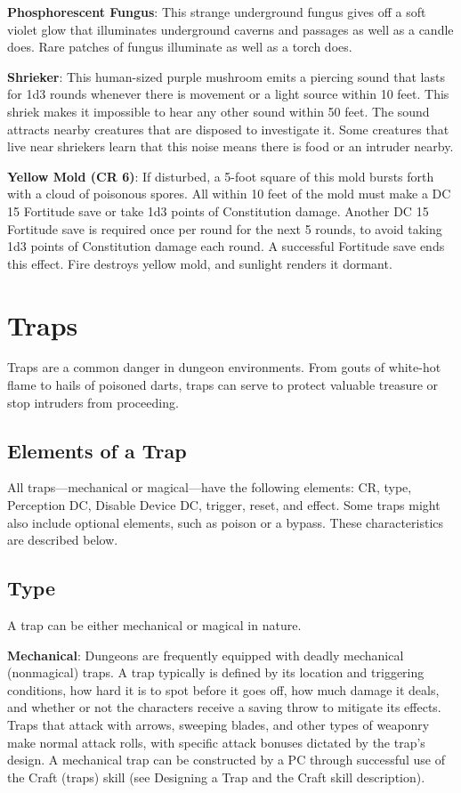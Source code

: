 \textbf{Phosphorescent Fungus}: This strange underground fungus gives off a soft violet glow that illuminates underground caverns and passages as well as a candle does. Rare patches of fungus illuminate as well as a torch does.
				
\textbf{Shrieker}: This human-sized purple mushroom emits a piercing sound that lasts for 1d3 rounds whenever there is movement or a light source within 10 feet. This shriek makes it impossible to hear any other sound within 50 feet. The sound attracts nearby creatures that are disposed to investigate it. Some creatures that live near shriekers learn that this noise means there is food or an intruder nearby.
				
\textbf{Yellow Mold (CR 6)}: If disturbed, a 5-foot square of this mold bursts forth with a cloud of poisonous spores. All within 10 feet of the mold must make a DC 15 Fortitude save or take 1d3 points of Constitution damage. Another DC 15 Fortitude save is required once per round for the next 5 rounds, to avoid taking 1d3 points of Constitution damage each round. A successful Fortitude save ends this effect. Fire destroys yellow mold, and sunlight renders it dormant.
				
\section{Traps}

				
Traps are a common danger in dungeon environments. From gouts of white-hot flame to hails of poisoned darts, traps can serve to protect valuable treasure or stop intruders from proceeding.
				
\subsection{Elements of a Trap}

				
All traps---mechanical or magical---have the following elements: CR, type, Perception DC, Disable Device DC, trigger, reset, and effect. Some traps might also include optional elements, such as poison or a bypass. These characteristics are described below.
				
\subsection{Type}

				
A trap can be either mechanical or magical in nature. 
				
\textbf{Mechanical}: Dungeons are frequently equipped with deadly mechanical (nonmagical) traps. A trap typically is defined by its location and triggering conditions, how hard it is to spot before it goes off, how much damage it deals, and whether or not the characters receive a saving throw to mitigate its effects. Traps that attack with arrows, sweeping blades, and other types of weaponry make normal attack rolls, with specific attack bonuses dictated by the trap's design. A mechanical trap can be constructed by a PC through successful use of the Craft (traps) skill (see Designing a Trap and the Craft skill description).
				
